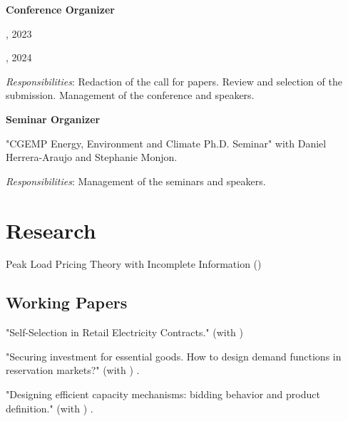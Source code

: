 \documentclass[letterpaper]{article}
\newcommand{\MYhref}[3][darkblue]{\href{#2}{\color{#1}{#3}}}%
\renewenvironment{itemize}{
  \begin{list}{}{
    \setlength{\leftmargin}{1.5em}
  }
}{
  \end{list}
}
\begin{document}
\begin{itemize}

\item \textbf{Conference Organizer}

\item \textcolor{darkcerulean}{\MYhref{https://leopoldmonjoie.com/files/Programme_PhD_Day.pdf}{"1st CEEM Ph.D. Conference - Toward a new electricity market model?"}}, 2023

\textcolor{darkcerulean}{\MYhref{https://leopoldmonjoie.com/files/Programme_PhD_Day_2.pdf}{"2nd CEEM Ph.D. Conference - Key issues for electricity market design"}}, 2024

\textit{Responsibilities}: Redaction of the call for papers. Review and selection of the submission. Management of the conference and speakers.

\item \textbf{Seminar Organizer}
\item "CGEMP Energy, Environment and Climate Ph.D. Seminar" with Daniel Herrera-Araujo and Stephanie Monjon.

\textit{Responsibilities}: Management of the seminars and speakers.

\end{itemize}




\section*{\textbf{Research}}

\begin{itemize}
\item  {Peak Load Pricing Theory with Incomplete Information} (\textcolor{darkblue}{\MYhref{http://leopoldmonjoie.com/files/monjoie_jmp.pdf}{\textbf{JMP}}})  
\end{itemize}

\subsection*{Working Papers}

\begin{itemize}
\item "Self-Selection in Retail Electricity Contracts." (with \textcolor{darkcerulean}{\MYhref{https://www.julienduc.net/}{Julien Duc}}) 
\item "Securing investment for essential goods. How to design demand functions in reservation markets?" (with \textcolor{darkcerulean}{\MYhref{https://www.compasslexecon.com/professionals/fabien-roques}{Fabien Roques}})   \textcolor{darkblue}{\MYhref{http://leopoldmonjoie.com/files/WP_Leopold_Monjoie.pdf}{2022 CEEM Working Paper 55}}.
\item "Designing efficient capacity mechanisms: bidding behavior and product definition." (with \textcolor{darkcerulean}{\MYhref{https://www.compasslexecon.com/professionals/fabien-roques}{Fabien Roques}})  \textcolor{darkblue}{\MYhref{http://leopoldmonjoie.com/files/WP54_Designing_efficient_capacity_mechanisms_bidding_behavior_and_product_definition_.pdf}{2021 CEEM Working Paper 54}}.
\end{itemize}
\end{document}
